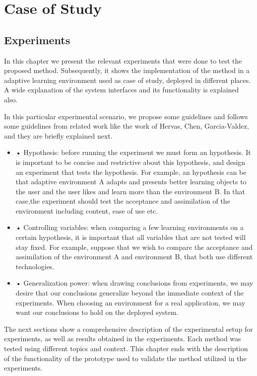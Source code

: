 \chapter{Case of Study} \label{expres} 
\section{Experiments}
In this chapter we present the relevant experiments that were done to test the proposed method. Subsequently, it shows the implementation of the method in a adaptive learning environment used as case of study, deployed in different places. A wide explanation of the system interfaces and its functionality is explained also.

In this particular experimental scenario, we propose some guidelines and follows some guidelines from related work like the work of Hervas\cite{bravo2005display}, Chen\cite{Chen2007}, Garcia-Valdez\cite{mariotesis}, and they are brieﬂy explained next.
\begin{itemize}	

\item • Hypothesis: before running the experiment we must form an hypothesis. It is important to be concise and restrictive about this hypothesis, and design an experiment that tests the hypothesis. For example, an hypothesis can be that adaptive environment A adapts and presents better learning objects to the user and the user likes and learn more than the environment B. In that case,the experiment should test the acceptance and assimilation of the environment including content, ease of use etc.

\item • Controlling variables: when comparing a few learning environments on a certain hypothesis, it is important that all variables that are not tested will
stay fixed. For example, suppose that we wish to compare the acceptance and assimilation of the environment A and environment B, that both use
different technologies. 

\item • Generalization power: when drawing conclusions from experiments, we may desire that our conclusions generalize beyond the immediate context of the experiments. When choosing an environment for a real application, we may want our conclusions to hold on the deployed system. 
\end{itemize}

The next sections show a comprehensive description of the experimental setup for experiments, as well as results obtained in the experiments. Each method was tested
using different topics and context. This chapter ends with the description of the functionality of the prototype used to validate the method utilized in the experiments.

